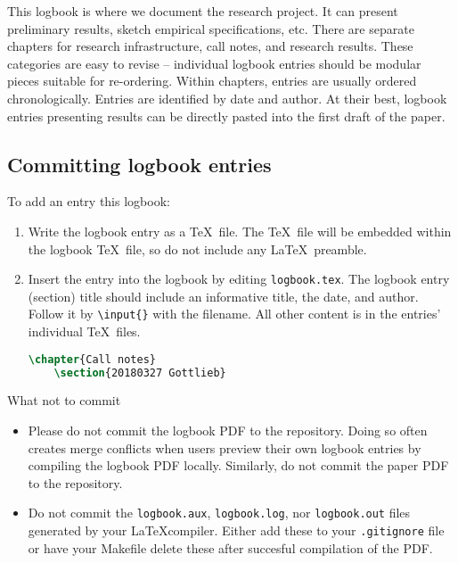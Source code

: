 
This logbook is where we document the research project.
It can present preliminary results, sketch empirical specifications, etc.
There are separate chapters for research infrastructure, call notes, and research results.
These categories are easy to revise -- individual logbook entries should be modular pieces suitable for re-ordering.
Within chapters, entries are usually ordered chronologically. Entries are identified by date and author.
At their best, logbook entries presenting results can be directly pasted into the first draft of the paper.

\subsection{Committing logbook entries}

To add an entry this logbook:
\begin{enumerate}
	\item Write the logbook entry as a \TeX\ file. The \TeX\ file will be embedded within the logbook \TeX\ file, so do not include any \LaTeX\ preamble.
	\item Insert the entry into the logbook by editing \texttt{logbook.tex}.
	The logbook entry (section) title should include an informative title, the date, and author. 
	Follow it by \texttt{\textbackslash input\{\}} with the filename.
	All other content is in the entries' individual \TeX\ files.
	\begin{lstlisting}[language=tex]
	\chapter{Call notes}
	\section{20180327 Gottlieb} 
	\end{lstlisting}
\end{enumerate}

What not to commit 
\begin{itemize}
	\item Please do not commit the logbook PDF to the repository. 
	Doing so often creates merge conflicts when users preview their own logbook entries by compiling the logbook PDF locally.
	Similarly, do not commit the paper PDF to the repository.
	\item Do not commit the \texttt{logbook.aux}, \texttt{logbook.log}, nor \texttt{logbook.out} files generated by your \LaTeX compiler.
	Either add these to your \texttt{.gitignore} file or have your Makefile delete these after succesful compilation of the PDF.
\end{itemize}
